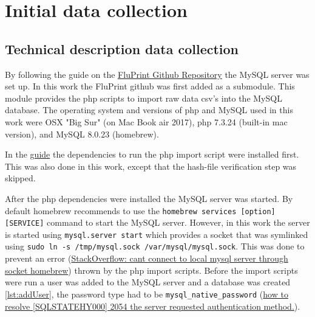 

\makeglossaries





\tableofcontents
\printglossary[type=bus]
\printglossary[type=dm]
\printglossary[type=\acronymtype]

\section{Initial data collection}

\subsection{Technical description data collection}

By following the guide on the
\href{https://github.com/LogIN-/fluprint}{FluPrint Github Repository} the MySQL
server was set up. In this work the FluPrint github was first added as a
submodule. This module provides the php scripts to import raw data csv's into
the MySQL database. The operating system and versions of php and MySQL used in
this work were OSX "Big Sur" (on Mac Book air 2017), php 7.3.24 (built-in mac
version), and MySQL 8.0.23 (homebrew).

In the \href{https://github.com/LogIN-/fluprint}{guide} the dependencies to run
the php import script were installed first. This was also done in this work,
except that the hash-file verification step was skipped.

After the php dependencies were installed the MySQL server was started. By
default homebrew recommends to use the \lstinline{homebrew services [option] [SERVICE]} command to start the MySQL server. However, in this work the server
is started using \lstinline{mysql.server start} which provides a socket that
was symlinked using \lstinline{sudo ln -s /tmp/mysql.sock /var/mysql/mysql.sock}. This was done to prevent an error
(\href{https://stackoverflow.com/questions/15016376/cant-connect-to-local-mysql-server-through-socket-homebrew/18090173}{StackOverflow: cant connect to local mysql server through socket homebrew}) thrown
by the php import scripts. Before the import scripts were run a user was added to the
MySQL server and a database was created \ref{lst:addUser}, the password type had to be \lstinline{mysql_native_password}
(\href{https://stackoverflow.com/questions/62873680/how-to-resolve-sqlstatehy000-2054-the-server-requested-authentication-metho}{how to resolve [SQLSTATEHY000] 2054 the server requested authentication method.}).

